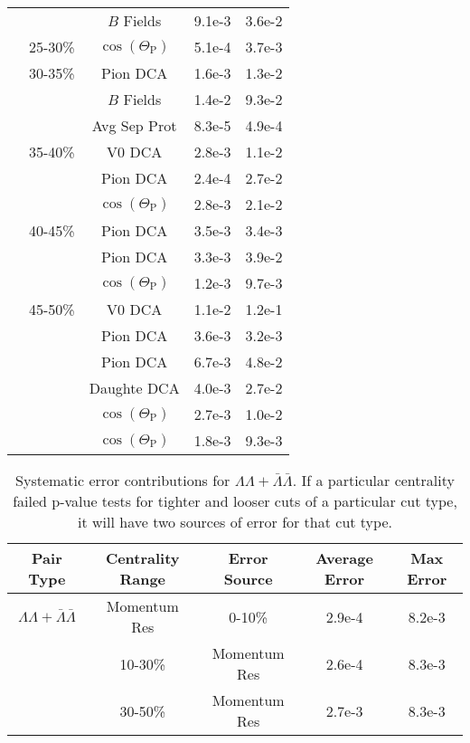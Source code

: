 \begin{table}
\begin{center}
\begin{tabular}{| c | c | c | c | c |}
   &         & $B$ Fields & 9.1e-3 & 3.6e-2 \\
   & 25-30\% & $\cos(\Theta_{\mathrm{P}})$ & 5.1e-4 & 3.7e-3 \\
   & 30-35\% & Pion DCA & 1.6e-3 & 1.3e-2 \\
   &         & $B$ Fields & 1.4e-2 & 9.3e-2 \\
   &         & Avg Sep Prot & 8.3e-5 & 4.9e-4 \\
   & 35-40\% & V0 DCA & 2.8e-3 & 1.1e-2 \\
   &         & Pion DCA & 2.4e-4 & 2.7e-2 \\
   &         & $\cos(\Theta_{\mathrm{P}})$ & 2.8e-3 & 2.1e-2 \\
   & 40-45\% & Pion DCA & 3.5e-3 & 3.4e-3 \\
   &         & Pion DCA & 3.3e-3 & 3.9e-2 \\
   &         & $\cos(\Theta_{\mathrm{P}})$ & 1.2e-3 & 9.7e-3 \\
   & 45-50\% & V0 DCA & 1.1e-2 & 1.2e-1 \\
   &         & Pion DCA & 3.6e-3 & 3.2e-3 \\
   &         & Pion DCA & 6.7e-3 & 4.8e-2 \\
   &         & Daughte DCA & 4.0e-3 & 2.7e-2 \\
   &         & $\cos(\Theta_{\mathrm{P}})$ & 2.7e-3 & 1.0e-2 \\
   &         & $\cos(\Theta_{\mathrm{P}})$ & 1.8e-3 & 9.3e-3 \\
   \hline
\end{tabular}
\end{center}
\end{table}
\begin{table}
\caption[Systematic error contributions for $\Lambda\Lambda + \bar{\Lambda}\bar{\Lambda}$] {Systematic error contributions for $\Lambda\Lambda + \bar{\Lambda}\bar{\Lambda}$.  If a particular centrality failed p-value tests for tighter and looser cuts of a particular cut type, it will have two sources of error for that cut type.} \label{tab:SysErrorSourcesLLAA} 
\begin{center}
\begin{tabular}{| c | c | c | c | c |}
  \hline                       
  Pair Type & Centrality Range & Error Source & Average Error & Max Error \\
  \hline
  $\Lambda\Lambda + \bar{\Lambda}\bar{\Lambda}$ & Momentum Res & 0-10\% & 2.9e-4 & 8.2e-3 \\
   & 10-30\% & Momentum Res & 2.6e-4 & 8.3e-3 \\
   & 30-50\% & Momentum Res & 2.7e-3 & 8.3e-3 \\
  \hline
\end{tabular}
\end{center}
\end{table}
